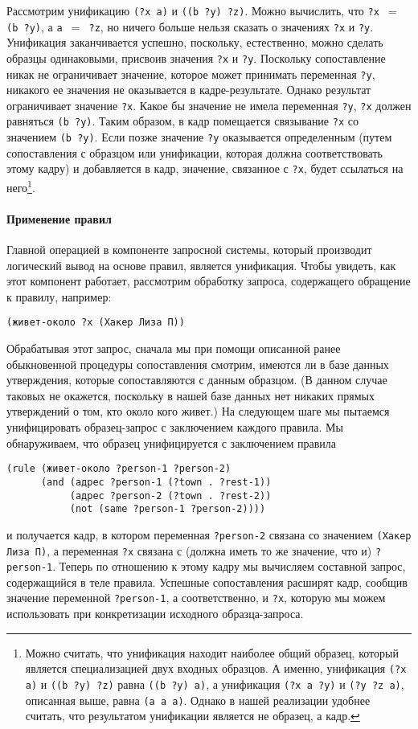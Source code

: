 Рассмотрим унификацию {\tt (?x a)} и {\tt ((b ?y)
?z)}.  Можно вычислить, что {\tt ?x $=$ (b ?y)}, а
{\tt a $=$ ?z}, но ничего больше нельзя сказать о значениях
{\tt ?x} и {\tt ?y}.  Унификация заканчивается успешно,
поскольку, естественно, можно сделать образцы одинаковыми, присвоив
значения {\tt ?x} и {\tt ?y}.  Поскольку сопоставление
никак не ограничивает значение, которое может принимать переменная
{\tt ?y}, никакого ее значения не оказывается в
кадре-результате.  Однако результат ограничивает значение
{\tt ?x}.  Какое бы значение не имела переменная
{\tt ?y}, {\tt ?x} должен равняться {\tt (b
?y)}.  Таким образом, в кадр помещается связывание
{\tt ?x} со значением {\tt (b ?y)}.  Если позже значение
{\tt ?y} оказывается определенным (путем сопоставления с
образцом или унификации, которая должна соответствовать этому кадру) и
добавляется в кадр, значение, связанное с {\tt ?x}, будет
ссылаться на него\footnote{Можно считать, что унификация находит наиболее 
общий образец, который является специализацией двух входных образцов.  А 
именно, унификация  {\tt (?x a)} и {\tt ((b ?y) ?z)} равна
{\tt ((b ?y) a)}, а унификация {\tt (?x a ?y)} и
{\tt (?y ?z a)}, описанная выше, равна {\tt (a a a)}.
Однако в нашей реализации удобнее считать, что результатом унификации
является не образец, а кадр.}.

\paragraph{Применение правил}

Главной операцией в 
компоненте запросной системы, который производит логический вывод на основе
правил, является унификация.  Чтобы увидеть, как этот компонент работает, 
рассмотрим обработку запроса, содержащего обращение к правилу, например:
\begin{Verbatim}[fontsize=\small]
(живет-около ?x (Хакер Лиза П))
\end{Verbatim}
Обрабатывая этот запрос, сначала мы при помощи описанной ранее
обыкновенной процедуры сопоставления смотрим, имеются
ли в базе данных утверждения, которые сопоставляются с данным
образцом.  (В данном случае таковых не окажется, поскольку в нашей базе
данных нет никаких прямых утверждений о том, кто около кого живет.)
На следующем шаге мы пытаемся унифицировать образец-запрос с
заключением каждого правила.  Мы обнаруживаем, что образец
унифицируется с заключением правила
\begin{Verbatim}[fontsize=\small]
(rule (живет-около ?person-1 ?person-2)
      (and (адрес ?person-1 (?town . ?rest-1))
           (адрес ?person-2 (?town . ?rest-2))
           (not (same ?person-1 ?person-2))))
\end{Verbatim}
и получается кадр, в котором переменная {\tt ?person-2} связана со значением
{\tt (Хакер Лиза П)}, а переменная {\tt ?x} связана с
(должна иметь то же значение, что и) {\tt ?person-1}.  Теперь по
отношению к этому кадру мы вычисляем составной запрос, содержащийся в
теле правила.  Успешные сопоставления расширят кадр, сообщив
значение переменной {\tt ?person-1}, а соответственно, и
{\tt ?x}, которую мы можем использовать при конкретизации
исходного образца-запроса.


